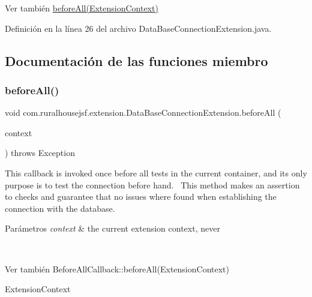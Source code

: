 \begin{DoxySeeAlso}{Ver también}
\mbox{\hyperlink{classcom_1_1ruralhousejsf_1_1extension_1_1_data_base_connection_extension_ae1fe703d5f0bdd5f29f0f4b9f0645e3e}{before\+All(\+Extension\+Context)}} 
\end{DoxySeeAlso}


Definición en la línea 26 del archivo Data\+Base\+Connection\+Extension.\+java.



\subsection{Documentación de las funciones miembro}
\mbox{\label{classcom_1_1ruralhousejsf_1_1extension_1_1_data_base_connection_extension_ae1fe703d5f0bdd5f29f0f4b9f0645e3e}} 
\subsubsection{\texorpdfstring{beforeAll()}{beforeAll()}}
{\footnotesize\ttfamily void com.\+ruralhousejsf.\+extension.\+Data\+Base\+Connection\+Extension.\+before\+All (\begin{DoxyParamCaption}\item[{Extension\+Context}]{context }\end{DoxyParamCaption}) throws Exception}

This callback is invoked once {\ttfamily before} all tests in the current container, and its only purpose is to test the connection before hand.~\newline
 This method makes an assertion to checks and guarantee that no issues where found when establishing the connection with the database.


\begin{DoxyParams}{Parámetros}
{\em context} & the current extension context, never
\begin{DoxyCode}{1}
\DoxyCodeLine{\textcolor{keyword}{null} }
\end{DoxyCode}
\\
\hline
\end{DoxyParams}
\begin{DoxySeeAlso}{Ver también}
Before\+All\+Callback\+::before\+All(\+Extension\+Context) 

Extension\+Context 
\end{DoxySeeAlso}


